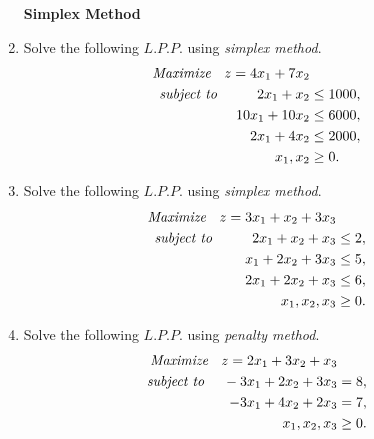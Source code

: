 \documentclass[11pt, a4paper]{article}
\begin{document}
\begin{enumerate}
\newpage

\begin{center}
\textbf{\huge Simplex Method}
\end{center}

\vspace{50pt}


\item Solve the following $L.P.P.$ using \textit{simplex method}.
	\begin{align*}
\textit{Maximize \hspace{6pt}} z = 4x_1 + 7x_2 \\
\textit{subject to \hspace{25pt}} 2x_1 + x_2 &\leq 1000, \\
10x_1 + 10x_2 &\leq 6000, \\
2x_1 + 4x_2 &\leq 2000, \\
x_1, x_2 &\geq 0.
	\end{align*}

\vspace{20pt}

	
\item Solve the following $L.P.P.$ using \textit{simplex method}.
	\begin{align*}
\textit{Maximize \hspace{6pt}} z = 3x_1 + x_2 + 3x_3 \\
\textit{subject to \hspace{25pt}} 2x_1 + x_2 + x_3 &\leq 2, \\
x_1 + 2x_2 + 3x_3 &\leq 5, \\
2x_1 + 2x_2 + x_3 &\leq 6, \\
x_1, x_2, x_3 &\geq 0.
	\end{align*}
	

\vspace{20pt}


\item Solve the following $L.P.P.$ using \textit{penalty method}.
	\begin{align*}
\textit{Maximize \hspace{6pt}} z = 2x_1 + 3x_2 + x_3 \\
\textit{subject to \hspace{10pt}} -3x_1 + 2x_2 + 3x_3 &= 8, \\
-3x_1 + 4x_2 + 2x_3 &= 7, \\
x_1, x_2, x_3 &\geq 0.
	\end{align*}
	

\end{enumerate}
\end{document}
